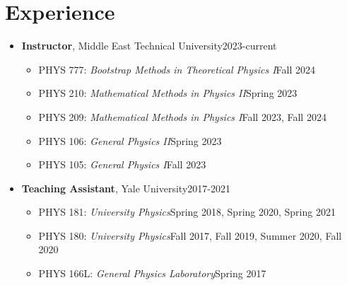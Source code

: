 \documentclass[a4paper,11pt]{article}
\begin{document}
\section{\textcolor{burntorange}{Experience}}
\begin{itemize}[noitemsep,nolistsep] 
	\item[] \textbf{Instructor}, Middle East Technical University\hfill 2023-current
\vspace*{-.3em}
\begin{itemize}
	\item[] PHYS 777: \emph{Bootstrap Methods in Theoretical Physics I}\hfill Fall 2024\hspace*{2.2em}\vspace*{-.3em}
	\item[] PHYS 210: \emph{Mathematical Methods in Physics II}\hfill Spring 2023\hspace*{2.2em}\vspace*{-.3em}
	\item[] PHYS 209: \emph{Mathematical Methods in Physics I}\hfill Fall 2023, Fall 2024\hspace*{2.2em}\vspace*{-.3em}
	\item[] PHYS 106: \emph{General Physics II}\hfill Spring 2023\hspace*{2.2em}\vspace*{-.3em}
	\item[] PHYS 105: \emph{General Physics I}\hfill Fall 2023\hspace*{2.2em}\vspace*{-.3em}
\end{itemize} 
	\item[] \textbf{Teaching Assistant}, Yale University\hfill 2017-2021
	\vspace*{-.3em}
	\begin{itemize}
		\item[] PHYS 181: \emph{University Physics}\hfill Spring 2018, Spring 2020, Spring 2021\hspace*{2.2em}\vspace*{-.3em}
		\item[] PHYS 180: \emph{University Physics}\hfill Fall 2017, Fall 2019, Summer 2020, Fall 2020\hspace*{2.2em}\vspace*{-.3em}
		\item[] PHYS 166L: \emph{General Physics Laboratory}\hfill Spring 2017\hspace*{2.2em}\vspace*{-.3em}

\end{itemize}
\end{itemize}
\end{document}
